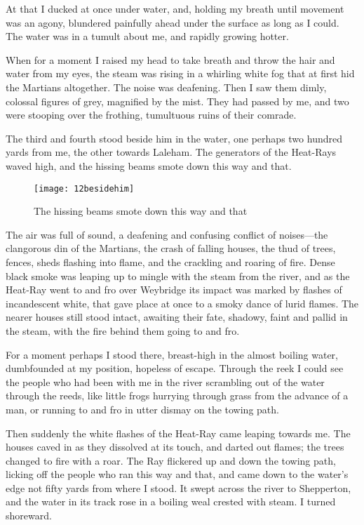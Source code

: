 At that I ducked at once under water, and, holding my breath until movement was an agony, blundered painfully ahead under the surface as long as I could. The water was in a tumult about me, and rapidly growing hotter.

When for a moment I raised my head to take breath and throw the hair and water from my eyes, the steam was rising in a whirling white fog that at first hid the Martians altogether. The noise was deafening. Then I saw them dimly, colossal figures of grey, magnified by the mist. They had passed by me, and two were stooping over the frothing, tumultuous ruins of their comrade.

The third and fourth stood beside him in the water, one perhaps two hundred yards from me, the other towards Laleham. The generators of the Heat-Rays waved high, and the hissing beams smote down this way and that.


\begin{figure}[tbp]
\centering
\texttt{[image: 12besidehim]}
\caption{The hissing beams smote down this way and that}
\end{figure}

The air was full of sound, a deafening and confusing conflict of noises—the clangorous din of the Martians, the crash of falling houses, the thud of trees, fences, sheds flashing into flame, and the crackling and roaring of fire. Dense black smoke was leaping up to mingle with the steam from the river, and as the Heat-Ray went to and fro over Weybridge its impact was marked by flashes of incandescent white, that gave place at once to a smoky dance of lurid flames. The nearer houses still stood intact, awaiting their fate, shadowy, faint and pallid in the steam, with the fire behind them going to and fro.

For a moment perhaps I stood there, breast-high in the almost boiling water, dumbfounded at my position, hopeless of escape. Through the reek I could see the people who had been with me in the river scrambling out of the water through the reeds, like little frogs hurrying through grass from the advance of a man, or running to and fro in utter dismay on the towing path.

Then suddenly the white flashes of the Heat-Ray came leaping towards me. The houses caved in as they dissolved at its touch, and darted out flames; the trees changed to fire with a roar. The Ray flickered up and down the towing path, licking off the people who ran this way and that, and came down to the water's edge not fifty yards from where I stood. It swept across the river to Shepperton, and the water in its track rose in a boiling weal crested with steam. I turned shoreward.

